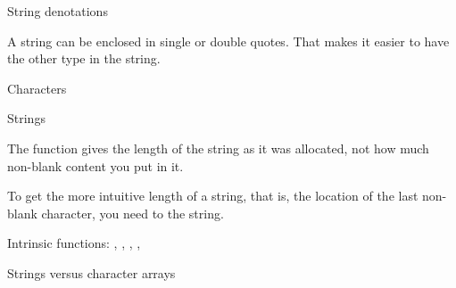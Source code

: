 
 {String denotations}

A string can be enclosed in single or double quotes. That makes it
easier to have the other type in the string.


 {Characters}

 {Strings}

The  function gives the length of the string as
it was allocated, not how much non-blank content you put in it.


To get the more intuitive length of a string, that is, the location of
the last non-blank character, you need to  the string.

Intrinsic functions: , ,
, , 


 {Strings versus character arrays}

